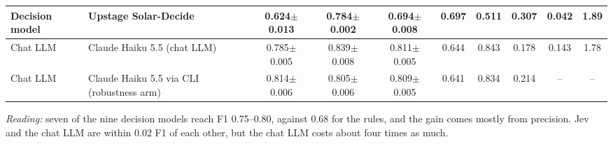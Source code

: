 \begin{table}[t]
\begin{tabular}{llcccccccc}
Decision model & Upstage Solar-Decide & 0.624$\pm$0.013 & 0.784$\pm$0.002 & 0.694$\pm$0.008 & 0.697 & 0.511 & 0.307 & 0.042 & 1.89 \\
\midrule
Chat LLM & Claude Haiku 5.5 (chat LLM) & 0.785$\pm$0.005 & 0.839$\pm$0.008 & 0.811$\pm$0.005 & 0.644 & 0.843 & 0.178 & 0.143 & 1.78 \\
Chat LLM & Claude Haiku 5.5 via CLI (robustness arm) & 0.814$\pm$0.006 & 0.805$\pm$0.006 & 0.809$\pm$0.005 & 0.641 & 0.834 & 0.214 & -- & -- \\
\bottomrule\end{tabular}
\par\vspace{3pt}\parbox{\textwidth}{\footnotesize\emph{Reading:} seven of the nine decision models reach F1 0.75--0.80, against 0.68 for the rules, and the gain comes mostly from precision. Jev and the chat LLM are within 0.02 F1 of each other, but the chat LLM costs about four times as much.}
\end{table}